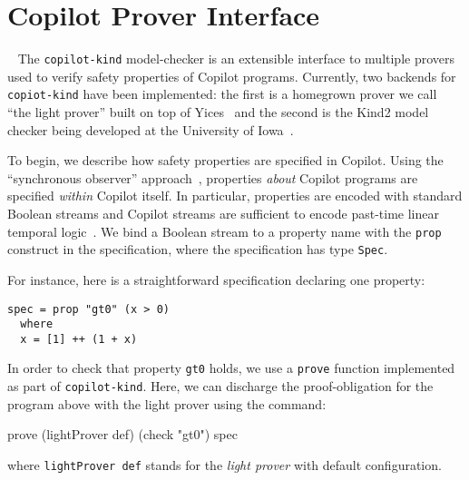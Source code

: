 \section{Copilot Prover Interface}~\label{sec:prover} 
The \texttt{copilot-kind} model-checker is an extensible interface to multiple
provers used to verify safety properties of Copilot
programs. Currently, two backends for \texttt{copiot-kind} have been implemented: the first is a
homegrown prover we call ``the light prover'' built on top of
Yices~\cite{Dutertre:cav2014} and the second is the Kind2 model checker being developed at
the University of Iowa~\cite{kind}.

To begin, we describe how safety properties are specified in Copilot. Using the
``synchronous observer'' approach~\cite{amast93}, properties \emph{about}
Copilot programs are specified \emph{within} Copilot itself. In particular,
properties are encoded with standard Boolean streams and Copilot streams are
sufficient to encode past-time linear temporal logic~\cite{ptltl}. We bind a Boolean stream
to a property name with the \texttt{prop} construct in the specification, where
the specification has type \texttt{Spec}. 

For instance, here is a straightforward specification declaring one
property:

\begin{lstlisting}[frame=single]
spec = prop "gt0" (x > 0)
  where 
  x = [1] ++ (1 + x)
\end{lstlisting}

In order  to check that property \texttt{gt0} holds, we use a \texttt{prove}
function implemented as part of \texttt{copilot-kind}.
Here, we can discharge the proof-obligation for the program above with the light prover using the command:
\begin{code}
prove (lightProver def) (check "gt0") spec
\end{code}
where \texttt{lightProver def} stands for the \emph{light prover} with
default configuration.


%
%
%  
%
%

